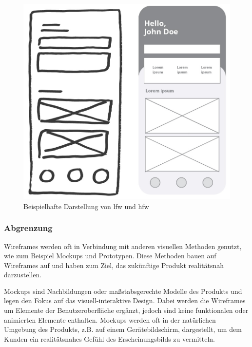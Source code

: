 \begin{figure}[!htb]
    \centering
    \includegraphics[scale=1]{figures/jan/Wire_Fixes-LFWvsHFW2.png}
    \caption[Beispielhafte Darstellung von \acrshort{lfw} und \acrshort{hfw}]{Beispielhafte Darstellung von \acrshort{lfw}  und \acrshort{hfw}}
    \label{fig:image}
\end{figure}

\subsubsection{Abgrenzung}
\label{sec:Abgrenzung}

Wireframes werden oft in Verbindung mit anderen visuellen Methoden genutzt, wie zum Beispiel Mockups und Prototypen. Diese Methoden bauen auf Wireframes auf und haben zum Ziel, das zukünftige Produkt realitätsnah darzustellen.

Mockups sind Nachbildungen oder maßstabsgerechte Modelle des Produkts und legen den Fokus auf das visuell-interaktive Design. Dabei werden die Wireframes um Elemente der Benutzeroberfläche ergänzt, jedoch sind keine funktionalen oder animierten Elemente enthalten. Mockups werden oft in der natürlichen Umgebung des Produkts, z.B. auf einem Gerätebildschirm, dargestellt, um dem Kunden ein realitätsnahes Gefühl des Erscheinungsbilds zu vermitteln.

